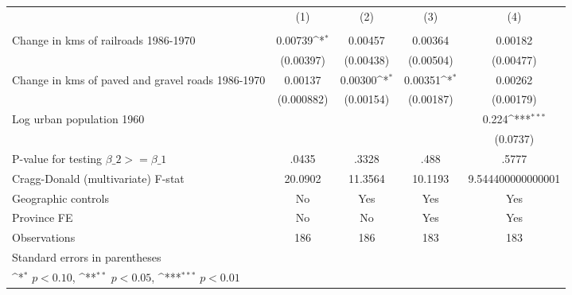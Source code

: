 {
\def\sym#1{\ifmmode^{#1}\else\(^{#1}\)\fi}
\begin{tabular}{l*{4}{c}}
\hline\hline
                &\multicolumn{1}{c}{(1)}&\multicolumn{1}{c}{(2)}&\multicolumn{1}{c}{(3)}&\multicolumn{1}{c}{(4)}\\
                &\multicolumn{1}{c}{}&\multicolumn{1}{c}{}&\multicolumn{1}{c}{}&\multicolumn{1}{c}{}\\
\hline
Change in kms of railroads 1986-1970&  0.00739\sym{*}  &  0.00457         &  0.00364         &  0.00182         \\
                &(0.00397)         &(0.00438)         &(0.00504)         &(0.00477)         \\
[1em]
Change in kms of paved and gravel roads 1986-1970&  0.00137         &  0.00300\sym{*}  &  0.00351\sym{*}  &  0.00262         \\
                &(0.000882)         &(0.00154)         &(0.00187)         &(0.00179)         \\
[1em]
Log urban population 1960&                  &                  &                  &    0.224\sym{***}\\
                &                  &                  &                  & (0.0737)         \\
\hline
P-value for testing $\beta\_{2} >= \beta\_{1}$&    .0435         &    .3328         &     .488         &    .5777         \\
Cragg-Donald (multivariate) F-stat&  20.0902         &  11.3564         &  10.1193         &9.544400000000001         \\
Geographic controls&       No         &      Yes         &      Yes         &      Yes         \\
Province FE     &       No         &       No         &      Yes         &      Yes         \\
Observations    &      186         &      186         &      183         &      183         \\
\hline\hline
\multicolumn{5}{l}{\footnotesize Standard errors in parentheses}\\
\multicolumn{5}{l}{\footnotesize \sym{*} \(p<0.10\), \sym{**} \(p<0.05\), \sym{***} \(p<0.01\)}\\
\end{tabular}
}
